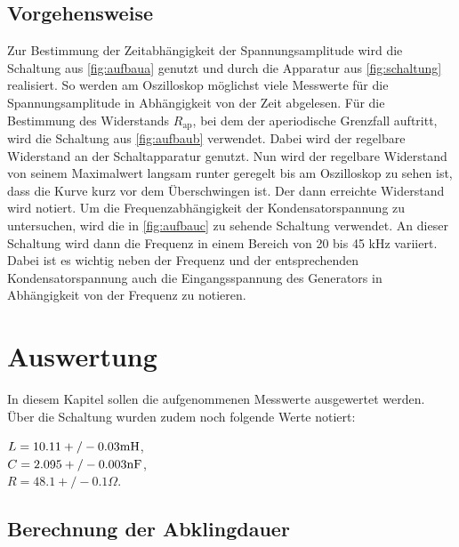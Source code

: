 \documentclass[
  bibliography=totoc,     %
  captions=tableheading,  %
  titlepage=firstiscover, %
]{scrartcl}
\begin{document}
   \subsection{Vorgehensweise}
  Zur Bestimmung der Zeitabhängigkeit der Spannungsamplitude wird die Schaltung aus
  \autoref{fig:aufbaua} genutzt und durch die Apparatur aus \autoref{fig:schaltung}
  realisiert. So werden am Oszilloskop möglichst viele Messwerte für die Spannungsamplitude
  in Abhängigkeit von der Zeit abgelesen. 
  \newline
  Für die Bestimmung des Widerstands
  $R_{\text{ap}}$, bei dem der aperiodische Grenzfall auftritt, wird 
  die Schaltung aus \autoref{fig:aufbaub} verwendet. Dabei wird der regelbare Widerstand an
  der Schaltapparatur genutzt. Nun wird der regelbare Widerstand von seinem Maximalwert
  langsam runter geregelt bis am Oszilloskop zu sehen ist, dass die Kurve kurz vor dem
  Überschwingen ist. Der dann erreichte Widerstand wird notiert.
  \newline 
  Um die Frequenzabhängigkeit der Kondensatorspannung zu
  untersuchen, wird die in \autoref{fig:aufbauc} zu sehende Schaltung verwendet. An dieser
  Schaltung wird dann die Frequenz in einem Bereich von 20 bis 45 kHz variiert. Dabei ist es wichtig
  neben der Frequenz und der entsprechenden Kondensatorspannung auch die Eingangsspannung
  des Generators in Abhängigkeit von der Frequenz zu notieren.
  
  \newpage
  \section{Auswertung}

  \label{sec:Auswertung}

  In diesem Kapitel sollen die aufgenommenen Messwerte ausgewertet werden.
  Über die Schaltung wurden zudem noch folgende Werte notiert:
  \begin{center}
      $L = 10.11 +/- 0.03 \si[]{mH}$,\\
      $C = 2.095 +/- 0.003 \si[]{nF}$,\\
      $R = 48.1 +/- 0.1 {\Omega}$.\\
  \end{center}
  \subsection{Berechnung der Abklingdauer}
\end{document}
